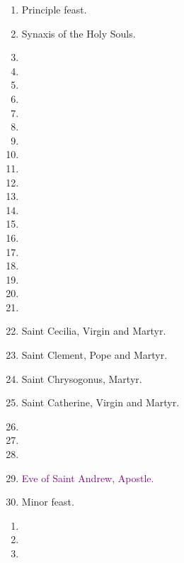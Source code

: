 		\begin{enumerate}
			\item {} Principle feast.
			\item Synaxis of the Holy Souls. 
			\item %
			\item %
			\item %
			\item %
			\item %
			\item %
			\item %
			\item %
			\item %
			\item %
			\item %
			\item %
			\item %
			\item %
			\item %
			\item %
			\item %
			\item %
			\item %
			\item Saint Cecilia, Virgin and Martyr. 
			\item Saint Clement, Pope and Martyr. 
			\item Saint Chrysogonus, Martyr. 
			\item Saint Catherine, Virgin and Martyr. 
			\item %
			\item %
			\item %
			\item \textcolor{purple}{Eve of Saint Andrew, Apostle.}
			\item {} Minor feast.
		\end{enumerate}
	
	\pagebreak[4]
	
	
		\begin{enumerate}
			\item %
			\item %
			\item %
		\end{enumerate}